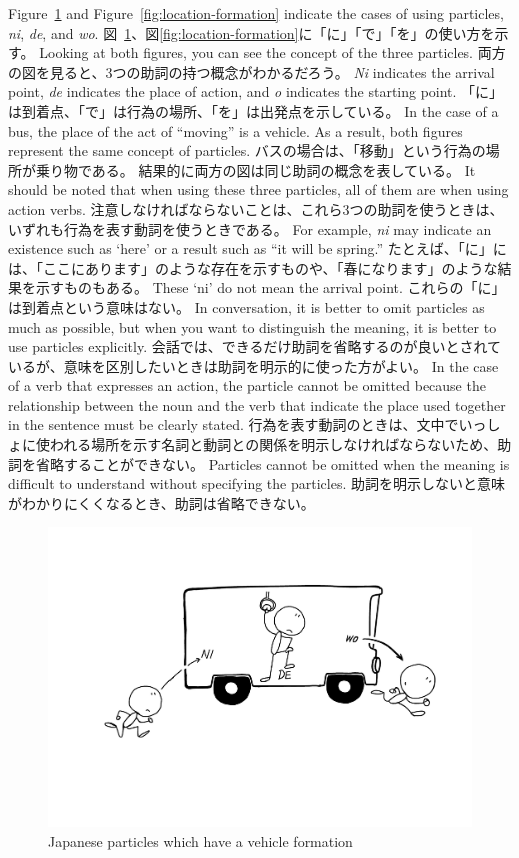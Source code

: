 \documentclass[uplatex,dvipdfmx,b5paper,english,10pt]{jsbook}
\begin{document}
\ifEnglish
Figure~\ref{fig:vehicle-formation} and Figure~\ref{fig:location-formation}
indicate the cases of using particles, {\it ni\/}, {\it de\/}, and {\it wo\/}.
\else
図~\ref{fig:vehicle-formation}、図\ref{fig:location-formation}に「に」「で」「を」の使い方を示す。
\fi
\ifEnglish
Looking at both figures, you can see the concept of the three particles.
\else
両方の図を見ると、3つの助詞の持つ概念がわかるだろう。
\fi
\ifEnglish
{\it Ni\/} indicates the arrival point, {\it de\/} indicates the place of action, and {\it o\/} indicates the starting point.
\else
「に」は到着点、「で」は行為の場所、「を」は出発点を示している。
\fi
\ifEnglish
In the case of a bus, the place of the act of ``moving'' is a vehicle.
As a result, both figures represent the same concept of particles.
\else
バスの場合は、「移動」という行為の場所が乗り物である。
結果的に両方の図は同じ助詞の概念を表している。
\fi
\ifEnglish
It should be noted that when using these three particles, all of them are when using action verbs.
\else
注意しなければならないことは、これら3つの助詞を使うときは、いずれも行為を表す動詞を使うときである。
\fi
\ifEnglish
For example, {\it ni\/} may indicate an existence such as `here' or a result such as ``it will be spring.''
\else
たとえば、「に」には、「ここにあります」のような存在を示すものや、「春になります」のような結果を示すものもある。
\fi
\ifEnglish
These `ni' do not mean the arrival point.
\else
これらの「に」は到着点という意味はない。
\fi
\ifEnglish
In conversation, it is better to omit particles as much as possible, but when you want to distinguish the meaning, it is better to use particles explicitly.
\else
会話では、できるだけ助詞を省略するのが良いとされているが、意味を区別したいときは助詞を明示的に使った方がよい。
\fi
\ifEnglish
In the case of a verb that expresses an action, the particle cannot be omitted because the relationship between the noun and the verb that indicate the place used together in the sentence must be clearly stated.
\else
行為を表す動詞のときは、文中でいっしょに使われる場所を示す名詞と動詞との関係を明示しなければならないため、助詞を省略することができない。
\fi
\ifEnglish
Particles cannot be omitted when the meaning is difficult to understand without specifying the particles.
\else
助詞を明示しないと意味がわかりにくくなるとき、助詞は省略できない。
\fi

\begin{figure}[htb]\centering\small
\includegraphics[trim=100 170 70 100, clip, width=.45\hsize]{subfiles/2019-06-01.pdf}
\caption{Japanese particles which have a vehicle formation}
\label{fig:vehicle-formation}
\end{figure}
\end{document}
